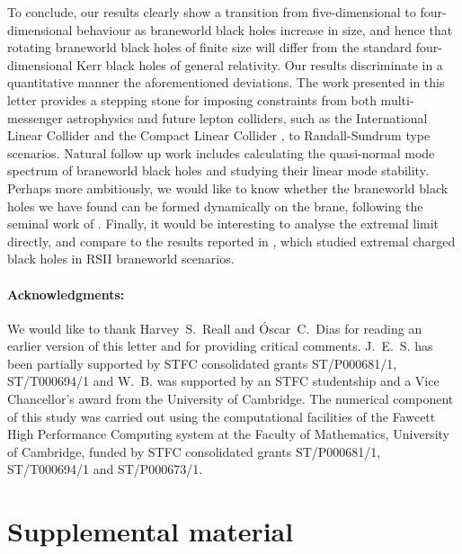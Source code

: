 \documentclass[%
 reprint,
 amsmath,amssymb,
 aps,
]{revtex4-2}
\begin{document}
To conclude, our results clearly show a transition from five-dimensional to four-dimensional behaviour as braneworld black holes increase in size, and hence that rotating braneworld black holes of finite size will differ from the standard four-dimensional Kerr black holes of general relativity. Our results discriminate in a quantitative manner the aforementioned deviations. The work presented in this letter provides a stepping stone for imposing constraints from both multi-messenger astrophysics \cite{Meszaros:2019xej} and future lepton colliders, such as the International Linear Collider \cite{ILC} and the Compact Linear Collider \cite{Roloff:2019crr}, to Randall-Sundrum type scenarios. Natural follow up work includes calculating the quasi-normal mode spectrum of braneworld black holes and studying their linear mode stability. Perhaps more ambitiously, we would like to know whether the braneworld black holes we have found can be formed dynamically on the brane, following the seminal work of \cite{Wang:2016nqi}. Finally, it would be interesting to analyse the extremal limit directly, and compare to the results reported in \cite{Kaus:2009cg}, which studied extremal charged black holes in RSII braneworld scenarios.

\paragraph*{Acknowledgments:}
We would like to thank Harvey~S.~Reall and \'Oscar~C.~Dias for reading an earlier version of this letter and for providing critical comments. J.~E.~S. has been partially supported by STFC consolidated grants ST/P000681/1, ST/T000694/1 and W.~B. was supported by an STFC studentship and a Vice Chancellor's award from the University of Cambridge. The numerical component of this study was carried out using the computational facilities of the Fawcett High Performance Computing system at the Faculty of Mathematics, University of Cambridge, funded by STFC consolidated grants ST/P000681/1, ST/T000694/1 and ST/P000673/1.

\newpage

\appendix

\section*{Supplemental material}

\end{document}
